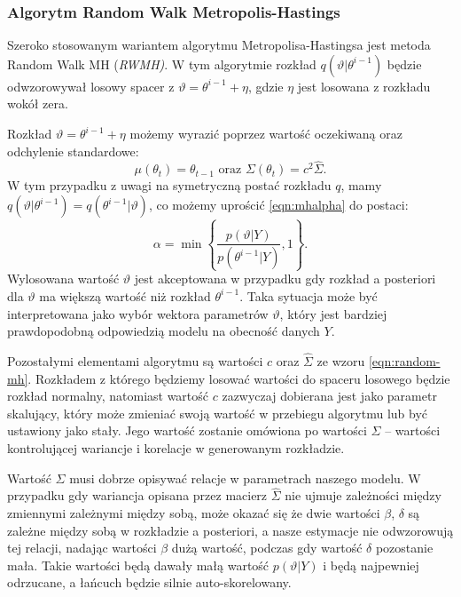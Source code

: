 \subsubsection{Algorytm Random Walk Metropolis-Hastings}
\label{sec:rwmh_algorithm}

Szeroko stosowanym wariantem algorytmu Metropolisa-Hastingsa jest metoda Random Walk MH (\emph{RWMH)}. W tym algorytmie rozkład $q(\vartheta|\theta^{i-1})$ będzie odwzorowywał losowy spacer z $\vartheta = \theta^{i-1} + \eta$, gdzie $\eta$ jest losowana z rozkładu wokół zera.

Rozkład $\vartheta = \theta^{i-1} + \eta$ możemy wyrazić poprzez wartość oczekiwaną oraz odchylenie standardowe:
\begin{equation}
    \label{eqn:random-mh}
    \mu(\theta_{t}) = \theta_{t-1} \text{ oraz } \Sigma(\theta_{t}) = c^2\hat{\Sigma}.
\end{equation}
W tym przypadku z uwagi na symetryczną postać rozkładu $q$, mamy $q(\vartheta|\theta^{i-1}) = q(\theta^{i-1}|\vartheta)$, co możemy uprościć \eqref{eqn:mhalpha} do postaci:
\begin{equation}
    \alpha = \min\left\{ \frac{p(\vartheta|Y)}{p(\theta^{i-1}|Y)}, 1\right\}.
\end{equation}
Wylosowana wartość $\vartheta$ jest akceptowana w przypadku gdy rozkład a posteriori dla $\vartheta$ ma większą wartość niż rozkład $\theta^{i-1}$. Taka sytuacja może być interpretowana jako wybór wektora parametrów $\vartheta$, który jest bardziej prawdopodobną odpowiedzią modelu na obecność danych $Y$.

Pozostałymi elementami algorytmu są wartości $c$ oraz $\hat{\Sigma}$ ze wzoru \eqref{eqn:random-mh}. Rozkładem z którego będziemy losować wartości do spaceru losowego będzie rozkład normalny, natomiast wartość $c$ zazwyczaj dobierana jest jako parametr skalujący, który może zmieniać swoją wartość w przebiegu algorytmu lub być ustawiony jako stały. Jego wartość zostanie omówiona po wartości $\Sigma$ -- wartości kontrolującej wariancje i korelacje w generowanym rozkładzie.

Wartość $\Sigma$ musi dobrze opisywać relacje w parametrach naszego modelu. W przypadku gdy wariancja opisana przez macierz $\hat{\Sigma}$ nie ujmuje zależności między zmiennymi zależnymi między sobą, może okazać się że dwie wartości $\beta$, $\delta$ są zależne między sobą w rozkładzie a posteriori, a nasze estymacje nie odwzorowują tej relacji, nadając wartości $\beta$ dużą wartość, podczas gdy wartość $\delta$ pozostanie mała. Takie wartości będą dawały małą wartość $p(\vartheta|Y)$ i będą najpewniej odrzucane, a łańcuch będzie silnie auto-skorelowany.

